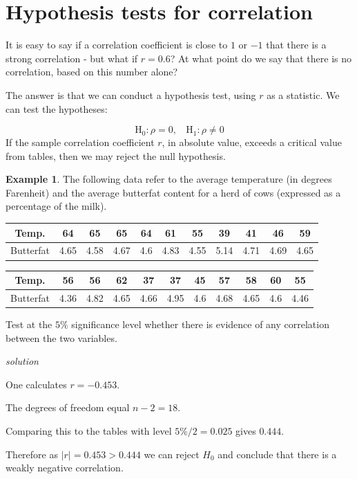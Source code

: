 \documentclass[
]{book}
\theoremstyle{definition}
\theoremstyle{definition}
\newtheorem{example}{Example}[chapter]
\theoremstyle{definition}
\theoremstyle{definition}
\theoremstyle{remark}
\begin{document}
\hypertarget{hypothesis-tests-for-correlation}{%
\section{Hypothesis tests for correlation}\label{hypothesis-tests-for-correlation}}

It is easy to say if a correlation coefficient is close to \(1\) or \(-1\) that there is a strong correlation - but what if \(r=0.6\)? At what point do we say that there is no correlation, based on this number alone?

The answer is that we can conduct a hypothesis test, using \(r\) as a statistic. We can test the hypotheses:

\[\text{H}_0 : \rho = 0, \ \  \ \  \text{H}_1: \rho \neq 0\]
If the sample correlation coefficient \(r\), in absolute value, exceeds a critical value from tables, then we may reject the null hypothesis.

\begin{example}
The following data refer to the average temperature (in degrees Farenheit) and the average butterfat content for a herd of cows (expressed as a percentage of the milk).

\begin{longtable}[]{@{}ccccccccccc@{}}
\toprule
Temp. & 64 & 65 & 65 & 64 & 61 & 55 & 39 & 41 & 46 & 59\tabularnewline
\midrule
\endhead
Butterfat & 4.65 & 4.58 & 4.67 & 4.6 & 4.83 & 4.55 & 5.14 & 4.71 & 4.69 & 4.65\tabularnewline
\bottomrule
\end{longtable}

\begin{longtable}[]{@{}ccccccccccc@{}}
\toprule
Temp. & 56 & 56 & 62 & 37 & 37 & 45 & 57 & 58 & 60 & 55\tabularnewline
\midrule
\endhead
Butterfat & 4.36 & 4.82 & 4.65 & 4.66 & 4.95 & 4.6 & 4.68 & 4.65 & 4.6 & 4.46\tabularnewline
\bottomrule
\end{longtable}

Test at the \(5\%\) significance level whether there is evidence of any correlation between the two variables.

\emph{solution}

One calculates \(r=-0.453\).

The degrees of freedom equal \(n-2 = 18\).

Comparing this to the tables with level \(5\% /2 = 0.025\) gives \(0.444\).

Therefore as \(|r| = 0.453 > 0.444\) we can reject \(H_0\) and conclude that there is a weakly negative correlation.
\end{example}
\end{document}
